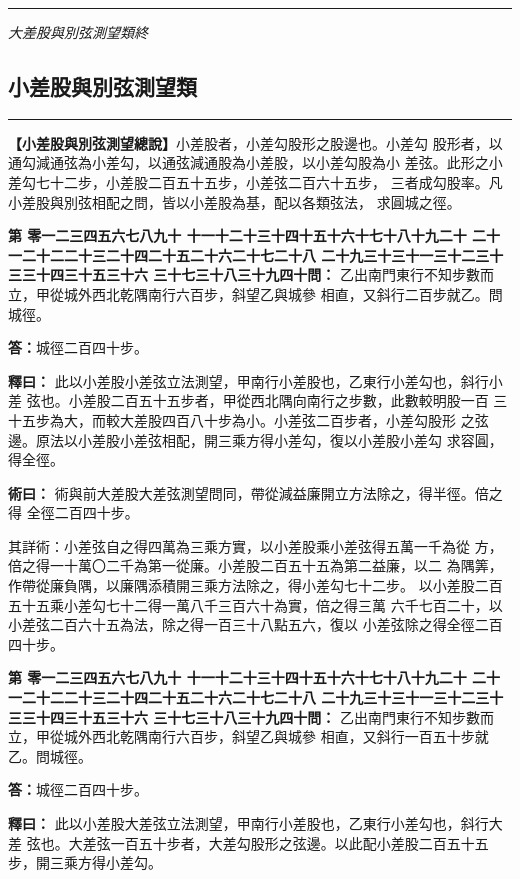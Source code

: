 \documentclass[11pt,a4paper]{article}
\newcommand{\longline}{\noindent\rule{\textwidth}{0.4pt}}
\newcounter{probnum}
\newcommand{\chnum}[1]{%
  \ifcase#1 零\or 一\or 二\or 三\or 四\or 五\or 六\or 七\or 八\or 九\or 十\or
    十一\or 十二\or 十三\or 十四\or 十五\or 十六\or 十七\or 十八\or 十九\or 二十\or
    二十一\or 二十二\or 二十三\or 二十四\or 二十五\or 二十六\or 二十七\or 二十八\or
    二十九\or 三十\or 三十一\or 三十二\or 三十三\or 三十四\or 三十五\or 三十六\or
    三十七\or 三十八\or 三十九\or 四十\fi}
\newcommand{\problem}[1]{\stepcounter{probnum}\par\noindent\textbf{第\chnum{\value{probnum}}問：}#1\par}
\newcommand{\answer}[1]{\par\noindent\textbf{答：}#1\par}
\newcommand{\shiyi}[1]{\par\noindent\textbf{釋曰：}#1\par}
\newcommand{\shuyue}[1]{\par\noindent\textbf{術曰：}#1\par}
\begin{document}
\vspace{0.5cm}
\longline
\begin{center}
\textit{大差股與別弦測望類終}
\end{center}

\newpage
\setcounter{probnum}{0}

\subsection*{小差股與別弦測望類}
\vspace{0.3cm}
\longline
\vspace{0.3cm}

\noindent
\textbf{【小差股與別弦測望總說】}小差股者，小差勾股形之股邊也。小差勾
股形者，以通勾減通弦為小差勾，以通弦減通股為小差股，以小差勾股為小
差弦。此形之小差勾七十二步，小差股二百五十五步，小差弦二百六十五步，
三者成勾股率。凡小差股與別弦相配之問，皆以小差股為基，配以各類弦法，
求圓城之徑。

\problem{
乙出南門東行不知步數而立，甲從城外西北乾隅南行六百步，斜望乙與城參
相直，又斜行二百步就乙。問城徑。
}

\answer{城徑二百四十步。}

\shiyi{
此以小差股小差弦立法測望，甲南行小差股也，乙東行小差勾也，斜行小差
弦也。小差股二百五十五步者，甲從西北隅向南行之步數，此數較明股一百
三十五步為大，而較大差股四百八十步為小。小差弦二百步者，小差勾股形
之弦邊。原法以小差股小差弦相配，開三乘方得小差勾，復以小差股小差勾
求容圓，得全徑。
}

\shuyue{
術與前大差股大差弦測望問同，帶從減益廉開立方法除之，得半徑。倍之得
全徑二百四十步。

其詳術：小差弦自之得四萬為三乘方實，以小差股乘小差弦得五萬一千為從
方，倍之得一十萬〇二千為第一從廉。小差股二百五十五為第二益廉，以二
為隅筭，作帶從廉負隅，以廉隅添積開三乘方法除之，得小差勾七十二步。
以小差股二百五十五乘小差勾七十二得一萬八千三百六十為實，倍之得三萬
六千七百二十，以小差弦二百六十五為法，除之得一百三十八點五六，復以
小差弦除之得全徑二百四十步。
}

\vspace{0.3cm}
\problem{
乙出南門東行不知步數而立，甲從城外西北乾隅南行六百步，斜望乙與城參
相直，又斜行一百五十步就乙。問城徑。
}

\answer{城徑二百四十步。}

\shiyi{
此以小差股大差弦立法測望，甲南行小差股也，乙東行小差勾也，斜行大差
弦也。大差弦一百五十步者，大差勾股形之弦邊。以此配小差股二百五十五
步，開三乘方得小差勾。
}
\end{document}
